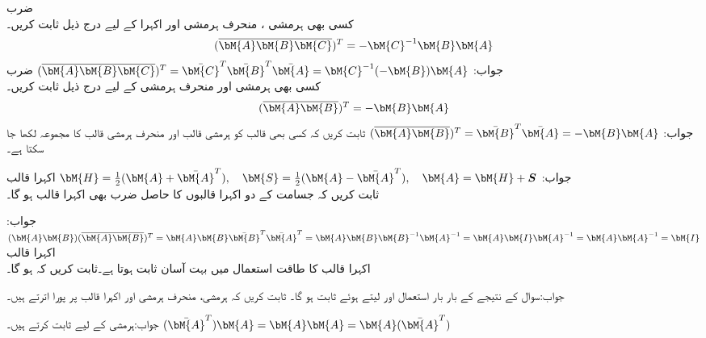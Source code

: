 \quad ضرب\\
کسی بھی  ہرمشی ، منحرف ہرمشی  اور اکہرا  کے لیے درج ذیل ثابت کریں۔
\begin{align*}
(\overline{\bM{A}\bM{B}\bM{C}})^T=-\bM{C}^{-1}\bM{B}\bM{A}
\end{align*}
جواب:
$(\overline{\bM{A}\bM{B}\bM{C}})^T=\bar{\bM{C}}^T\bar{\bM{B}}^T\bar{\bM{A}}=\bM{C}^{-1}(-\bM{B})\bM{A}$
\quad ضرب\\
کسی بھی  ہرمشی  اور منحرف ہرمشی  کے لیے درج ذیل ثابت کریں۔
\begin{align*}
(\overline{\bM{A}\bM{B}})^T=-\bM{B}\bM{A}
\end{align*}
جواب:
$(\overline{\bM{A}\bM{B}})^T=\bar{\bM{B}}^T\bar{\bM{A}}=-\bM{B}\bM{A}$
ثابت کریں کہ کسی بھی قالب  کو ہرمشی قالب  اور منحرف ہرمشی قالب  کا مجموعہ لکھا جا سکتا ہے۔

جواب:
$\bM{H}=\tfrac{1}{2}(\bM{A}+\bar{\bM{A}}^T),\quad \bM{S}=\tfrac{1}{2}(\bM{A}-\bar{\bM{A}}^T),\quad \bM{A}=\bM{H}+\bm{S}$
\quad اکہرا قالب\\
ثابت کریں کہ  جسامت کے  دو اکہرا قالبوں کا حاصل ضرب بھی اکہرا قالب ہو گا۔ 

جواب:
$(\bM{A}\bM{B})(\overline{\bM{A}\bM{B}})^T=\bM{A}\bM{B}\bar{\bM{B}}^T\bar{\bM{A}}^T=\bM{A}\bM{B}\bM{B}^{-1}\bM{A}^{-1}=\bM{A}\bM{I}\bM{A}^{-1}=\bM{A}\bM{A}^{-1}=\bM{I}$
\quad اکہرا قالب\\
اکہرا قالب کا طاقت استعمال میں بہت آسان ثابت ہوتا ہے۔ثابت کریں کہ  ہو گا۔ 

جواب:سوال   کے نتیجے کے بار بار استعمال اور  لیتے ہوئے ثابت ہو گا۔
ثابت کریں کہ ہرمشی، منحرف ہرمشی اور اکہرا قالب  پر پورا اترتے ہیں۔

جواب:ہرمشی کے لیے ثابت کرتے ہیں۔
$(\bar{\bM{A}}^T)\bM{A}=\bM{A}\bM{A}=\bM{A}(\bar{\bM{A}}^T)$


